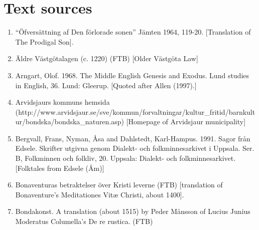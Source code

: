 \section[Text sources]{\rmfamily Text sources}
\begin{enumerate} %
\item 
“Öfversättning af Den förlorade sonen” Jämten 1964, 119-20. [Translation of The Prodigal Son]. 
\item 
\label{bkm:Ref154219978}Äldre Västgötalagen (c. 1220) (FTB) [Older Västgöta Law]

\item 
\label{bkm:Ref151372879}Arngart, Olof. 1968. The Middle English Genesis and Exodus. Lund studies in English, 36. Lund: Gleerup. [Quoted after Allen (1997).]
\item 
\label{bkm:Ref137879837}Arvidsjaurs kommuns hemsida (http://www.arvidsjaur.se/sve/kommun/forvaltningar/kultur\_fritid/barnkultur/bondska/bondska\_naturen.asp) [Homepage of Arvidsjaur municipality]

\item 
\label{bkm:Ref150329670}Bergvall, Frans, Nyman, Åsa and Dahlstedt, Karl-Hampus. 1991. Sagor från Edsele. Skrifter utgivna genom Dialekt- och folkminnesarkivet i Uppsala. Ser. B, Folkminnen och folkliv, 20. Uppsala: Dialekt- och folkminnesarkivet. [Folktales from Edsele (Åm)]

\item 
\label{bkm:Ref154213744}Bonaventuras betraktelser över Kristi leverne (FTB) [translation of Bonaventure’s Meditationes Vitæ Christi, about 1400]. 

\item 
\label{bkm:Ref137881255}\label{bkm:Ref155341449}Bondakonst. A translation (about 1515) by Peder Månsson of Lucius Junius Moderatus Columella’s De re rustica. (FTB) 


\end{enumerate}
